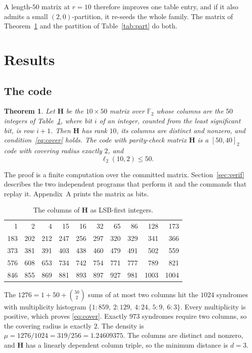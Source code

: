 \documentclass[11pt,a4paper]{article}
\newcommand{\FF}{\mathbb{F}}
\newcommand{\HH}{\boldsymbol{H}}
\newcommand{\ellr}{\ell_2}
\newtheorem{theorem}{Theorem}
\begin{document}
A length-$50$ matrix at $r=10$ therefore improves one table entry, and
if it also admits a small $(2,0)$-partition, it re-seeds the whole
family. The matrix of Theorem~\ref{thm:main} and the partition of
Table~\ref{tab:part} do both.

\section{Results}

\subsection{The code}

\begin{theorem}
\label{thm:main}
Let $\HH$ be the $10\times 50$ matrix over $\FF_2$ whose columns are
the $50$ integers of Table~\ref{tab:cols}, where bit $i$ of an integer,
counted from the least significant bit, is row $i+1$. Then $\HH$ has
rank $10$, its columns are distinct and nonzero, and
condition~\eqref{eq:cover} holds. The code with parity-check matrix
$\HH$ is a $[50,40]_2$ code with covering radius exactly $2$, and
\[
\ellr(10,2)\le 50 .
\]
\end{theorem}

The proof is a finite computation over the committed matrix.
Section~\ref{sec:verif} describes the two independent programs that
perform it and the commands that replay it. Appendix~A prints the
matrix as bits.

\begin{table}[ht]
\centering
\small
\begin{tabular}{@{}*{10}{r}@{}}
  1 & 2 & 4 & 15 & 16 & 32 & 65 & 86 & 128 & 173 \\
183 & 202 & 212 & 247 & 256 & 297 & 320 & 329 & 341 & 366 \\
373 & 381 & 391 & 403 & 438 & 460 & 479 & 491 & 502 & 559 \\
576 & 608 & 653 & 734 & 742 & 754 & 771 & 777 & 789 & 821 \\
846 & 855 & 869 & 881 & 893 & 897 & 927 & 981 & 1003 & 1004 \\
\end{tabular}
\caption{The columns of $\HH$ as LSB-first integers.}
\label{tab:cols}
\end{table}

The $1276=1+50+\binom{50}{2}$ sums of at most two columns hit the
$1024$ syndromes with multiplicity histogram
$\{1{:}859,\ 2{:}129,\ 4{:}24,\ 5{:}9,\ 6{:}3\}$. Every multiplicity
is positive, which proves \eqref{eq:cover}. Exactly $973$ syndromes
require two columns, so the covering radius is exactly $2$. The
density is $\mu=1276/1024=319/256=1.24609375$. The columns are distinct
and nonzero, and $\HH$ has a linearly dependent column triple, so the
minimum distance is $d=3$.
\end{document}

